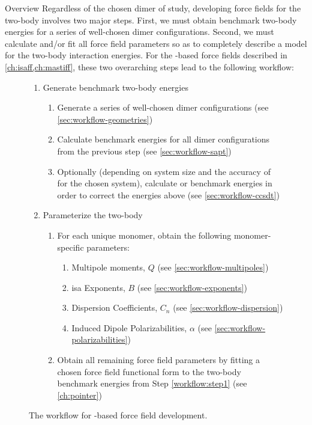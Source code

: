 \begin{section}{Overview}
Regardless of the chosen dimer of study, developing force fields for the
two-body \pes involves two major steps.  First, we must
obtain benchmark two-body energies for a series of well-chosen dimer
configurations. Second, we must
calculate and/or fit all force field parameters so as to completely describe a
model for the two-body interaction energies. For the \sapt-based force fields described in
\cref{ch:isaff,ch:mastiff}, 
these two overarching steps lead to the following workflow:
%
\begin{figure}
\begin{enumerate}[label=\Roman*)]
\item Generate benchmark two-body energies
\label{workflow:step1}
    \begin{enumerate}[label=\arabic*)]
    \item Generate a series of well-chosen dimer configurations
        (see \cref{sec:workflow-geometries})
    \item Calculate \dftsapt benchmark energies for all dimer configurations from
the previous step
        (see \cref{sec:workflow-sapt})
    \item Optionally (depending on system size and the accuracy of \dftsapt
for the chosen system), calculate \ccsdt or \ccsdtf benchmark energies in
order to correct the \dftsapt energies above
        (see \cref{sec:workflow-ccsdt})
    \end{enumerate}
\item Parameterize the two-body \pes
\label{workflow:step2}
    \begin{enumerate}[label=\arabic*)]
    \item For each unique monomer, obtain the following monomer-specific parameters:
        \begin{enumerate}
        \item Multipole moments, $Q$
            (see \cref{sec:workflow-multipoles})
        \item \acrshort{isa} Exponents, $B$ 
            (see \cref{sec:workflow-exponents})
        \item Dispersion Coefficients, $C_n$
            (see \cref{sec:workflow-dispersion})
        \item Induced Dipole Polarizabilities, $\alpha$
            (see \cref{sec:workflow-polarizabilities})
        \end{enumerate}
    \item Obtain all remaining force field parameters by fitting a chosen
    force field functional form to the two-body benchmark energies from Step \ref{workflow:step1}
        (see \cref{ch:pointer})
    \end{enumerate}
\end{enumerate}
\caption{The workflow for \sapt-based force field development.}
\end{figure}


\end{section}
